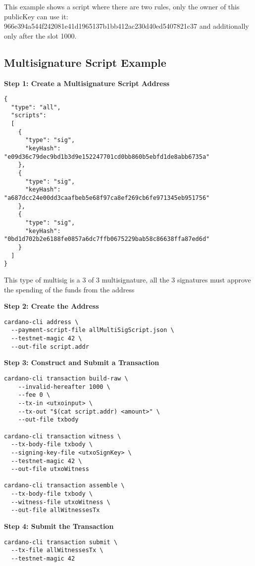 This example shows a script where there are two rules, only the owner of this publicKey can use it: 966e394a544f242081e41d1965137b1bb412ac230d40ed5407821c37 
and additionally only after the slot 1000.


\subsection{Multisignature Script Example}

\textbf{Step 1: Create a Multisignature Script Address}

\begin{lstlisting}
{
  "type": "all",
  "scripts":
  [
    {
      "type": "sig",
      "keyHash": "e09d36c79dec9bd1b3d9e152247701cd0bb860b5ebfd1de8abb6735a"
    },
    {
      "type": "sig",
      "keyHash": "a687dcc24e00dd3caafbeb5e68f97ca8ef269cb6fe971345eb951756"
    },
    {
      "type": "sig",
      "keyHash": "0bd1d702b2e6188fe0857a6dc7ffb0675229bab58c86638ffa87ed6d"
    }
  ]
}
\end{lstlisting}

This type of multisig is a 3 of 3 multisignature, all the 3 signatures must approve the spending of the funds from the address

\textbf{Step 2: Create the Address}

\begin{verbatim}
cardano-cli address \
  --payment-script-file allMultiSigScript.json \
  --testnet-magic 42 \
  --out-file script.addr
\end{verbatim}

\textbf{Step 3: Construct and Submit a Transaction}

\begin{verbatim}
cardano-cli transaction build-raw \
    --invalid-hereafter 1000 \
    --fee 0 \
    --tx-in <utxoinput> \
    --tx-out "$(cat script.addr) <amount>" \
    --out-file txbody

cardano-cli transaction witness \
  --tx-body-file txbody \
  --signing-key-file <utxoSignKey> \
  --testnet-magic 42 \
  --out-file utxoWitness

cardano-cli transaction assemble \
  --tx-body-file txbody \
  --witness-file utxoWitness \
  --out-file allWitnessesTx
\end{verbatim}

\textbf{Step 4: Submit the Transaction}

\begin{verbatim}
cardano-cli transaction submit \
  --tx-file allWitnessesTx \
  --testnet-magic 42
\end{verbatim}

